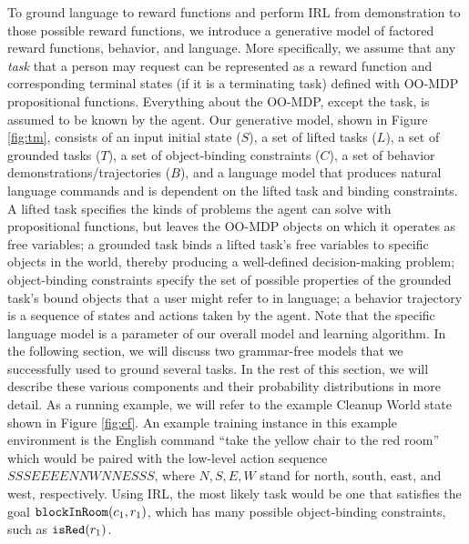 \documentclass[conference]{IEEEtran}
\newcommand{\stnote}[1]{\textcolor{Blue}{\textbf{ST: #1}}}
\begin{document}
To ground language to reward functions and perform IRL from demonstration to those possible reward functions, we introduce a generative model of factored reward functions, behavior, and language. More specifically, we assume that any {\em task} that a person may request can be represented as a reward function and corresponding terminal states (if it is a terminating task) defined with OO-MDP propositional functions. 
Everything about the OO-MDP, except the task, is assumed to be known by the agent. Our generative model, shown in Figure \ref{fig:tm}, consists of an input initial state ($S$), a set of lifted tasks ($L$), a set of grounded tasks ($T$), a set of object-binding constraints ($C$), a set of behavior demonstrations/trajectories ($B$), and a language model that produces natural language commands and is dependent on the lifted task and binding constraints. A lifted task specifies the kinds of problems the agent can solve with propositional functions, but leaves the OO-MDP objects on which it operates as free variables; a grounded task binds a lifted task's free variables to specific objects in the world, thereby producing a well-defined decision-making problem; object-binding constraints specify the set of possible properties of the grounded task's bound objects that a user might refer to in language; a behavior trajectory is a sequence of states and actions taken by the agent. Note that the specific language model is a parameter of our overall model and learning algorithm. In the following section, we will discuss two grammar-free models that we successfully used to ground several tasks. In the rest of this section, we will describe these various components and their probability distributions in more detail. As a running example, we will refer to the example Cleanup World state shown in Figure \ref{fig:ef}. An example training instance in this example environment is the English command ``take the yellow chair to the red room'' which would be paired with the low-level action sequence $SSSEEEENNWNNESSS$, where $N, S, E, W$ stand for north, south, east, and west, respectively. Using IRL, the most likely task would be one that satisfies the goal ${\tt blockInRoom}(c_1, r_1)$, which has many possible object-binding constraints, such as ${\tt isRed}(r_1)$.


\end{document}

